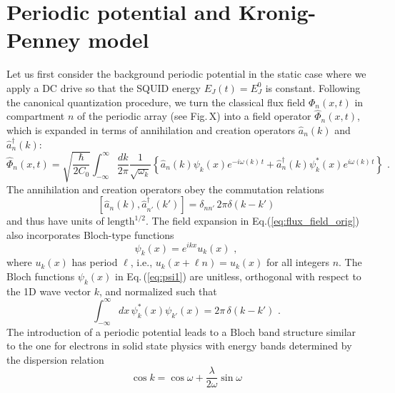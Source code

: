 \section{Periodic potential and Kronig-Penney model}\label{sec:Kronig-Penney}
%
\noindent
Let us first consider the background periodic potential in the static case where we apply a DC drive so that the SQUID energy $E_J(t) = E_J^0$ is constant. Following the canonical quantization procedure, 
we turn the classical flux field ${\Phi}_n(x,t)$ 
in compartment $n$ of the periodic array \color{red} (see Fig.\,X) \color{black}
into a field operator $\hat{\Phi}_n(x,t)$, which is expanded in terms of 
annihilation and creation operators $ \hat{a}_n(k)$ and 
${\hat a}_n^\dagger(k)$:
%
\begin{equation} \label{eq:flux_field_orig}
    \hat{\Phi}_n(x,t) = \sqrt{\frac{\hbar}{2 C_0}} 
    \int_{-\infty}^{\infty}\frac{dk}{2 \pi} \frac{1}{\sqrt{\omega_k}}
    \left\{ \hat{a}_n(k) \psi_k(x)e^{-i \omega(k) \, t} + 
    \hat{a}_n^{\dagger}(k) \psi_k^*(x) e^{i \omega(k) \, t} \right\} \, \, .
\end{equation}
%
The annihilation and creation operators obey the commutation relations
%
\begin{equation} \label{eq:cra_orig}
    \left[ \hat{a}_n(k),{\hat a}_{n'}^\dagger(k') \right] = \delta_{nn'} \, 2 \pi \delta(k - k')
\end{equation}
%
and thus have units of $\text{length}^{1/2}$.
The field expansion in Eq.(\ref{eq:flux_field_orig}) also incorporates Bloch-type functions 
%
\begin{equation} \label{eq:psi1}
\psi_k(x) = e^{i k x} u_k(x) \, \, ,   
\end{equation}
%
where $u_k(x)$ has period $\ell$, i.e., $u_k(x + \ell n) = u_k(x)$ for all integers $n$.
The Bloch functions $\psi_k(x)$ in Eq.\,(\ref{eq:psi1}) are unitless, orthogonal with respect to 
the 1D wave vector $k$, and normalized such that
%
\begin{equation} \label{eq:psi1_norm_orig}
\int_{-\infty}^{\infty} dx \, \psi^*_k(x) \psi_{k'}(x) = 2 \pi \, \delta(k - k') \, \, .
\end{equation}
%
%
The introduction of a periodic potential leads to a Bloch band structure similar to the one for electrons in solid state physics with energy bands determined by the dispersion relation
\begin{equation}\label{eq:disp_rel}
    \cos{k} = \cos{\omega} + \frac{\lambda}{2\omega}\sin{\omega}
\end{equation}
